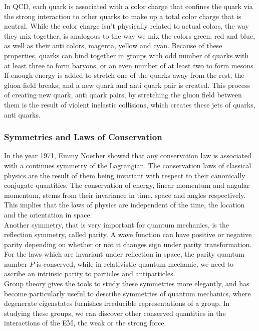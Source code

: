 \documentclass[12pt,a4paper]{article}
\begin{document}
In QCD, each quark is associated with a color charge that confines the quark via
the strong interaction to other quarks to make up a total color charge that is
neutral. While the color charge isn't physically related to actual colors, the
way they mix together, is analogous to the way we mix the colors green, red and
blue, as well as their anti colors, magenta, yellow and cyan. Because of these
properties, quarks can bind together in groups with odd number of quarks with
at least three to form baryons, or an even number of at least two to form mesons.\\

If enough energy is added to stretch one of the quarks away from the rest, the
gluon field breaks, and a new quark and anti quark pair is created. This process
of creating new quark, anti quark pairs, by stretching the gluon field between
them is the result of violent inelastic collisions, which creates these jets of
quarks, anti quarks.\\

\subsubsection{Symmetries and Laws of Conservation}
In the year 1971, Emmy Noether showed that any conservation law is associated
with a continues symmetry of the Lagrangian\cite{Noether_1971}. The
conservation laws of classical physics are the result of them being invariant
with respect to their canonically conjugate quantities. The conservation of
energy, linear momentum and angular momentum, stems from their invariance in
time, space and angles respectively. This implies that the laws of physics are
independent of the time, the location and the orientation in space.\\

Another symmetry, that is very important for quantum mechanics, is the
reflection symmetry, called parity. A wave function can have positive or
negative parity depending on whether or not it changes sign under parity
transformation. For the laws which are invariant under reflection in space, the
parity quantum number $P$ is conserved, while in relativistic quantum mechanic,
we need to ascribe an intrinsic parity to particles and antiparticles.\\

Group theory gives the tools to study these symmetries more elegantly, and has
become particularly useful to describe symmetries of quantum mechanics, where
degenerate eigenstates furnishes irreducible representations of a group. In
studying these groups, we can discover other conserved quantities in the
interactions of the EM, the weak or the strong force.\\
\end{document}
